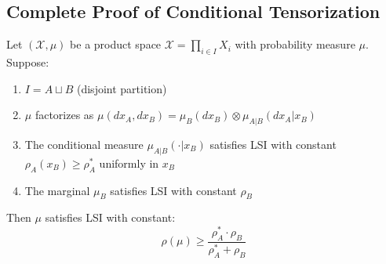 \subsection{Complete Proof of Conditional Tensorization}
\label{subsec:complete_cond_tensor}

\begin{theorem}
\label{thm:cond_tensor_complete}
Let $(\mathcal{X}, \mu)$ be a product space $\mathcal{X} = \prod_{i \in I} X_i$ with probability measure $\mu$. Suppose:
\begin{enumerate}
\item[(C1)] $I = A \sqcup B$ (disjoint partition)
\item[(C2)] $\mu$ factorizes as $\mu(dx_A, dx_B) = \mu_B(dx_B) \otimes \mu_{A|B}(dx_A | x_B)$
\item[(C3)] The conditional measure $\mu_{A|B}(\cdot | x_B)$ satisfies LSI with constant $\rho_A(x_B) \geq \rho_A^*$ uniformly in $x_B$
\item[(C4)] The marginal $\mu_B$ satisfies LSI with constant $\rho_B$
\end{enumerate}
Then $\mu$ satisfies LSI with constant:
\begin{equation}
\rho(\mu) \geq \frac{\rho_A^* \cdot \rho_B}{\rho_A^* + \rho_B}
\end{equation}
\end{theorem}

